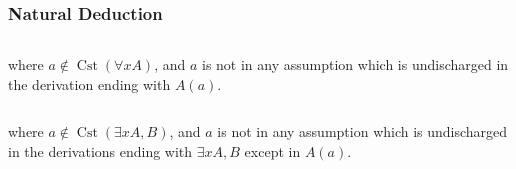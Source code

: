 \documentclass[UTF8,11pt,colorlinks,compress,openany]{beamer}%
\begin{document}
\begin{frame}\frametitle{Natural Deduction}
\begin{columns}
\centering
{}
\centering
{}
\end{columns}
where $a\notin\operatorname{Cst}(\forall x A)$, and $a$ is not in any assumption which is undischarged in the derivation ending with $A(a)$.\\
\hrulefill
\vspace{5pt}
\begin{columns}
\centering
{}
\centering
{}
\end{columns}
where $a\notin\operatorname{Cst}(\exists x A, B)$, and $a$ is not in any assumption which is undischarged in the derivations ending with $\exists x A, B$ except in $A(a)$.\\
\hrulefill
\vspace{5pt}
\begin{columns}
\centering
{}
\centering
{}
\end{columns}
\end{frame}
\end{document}
